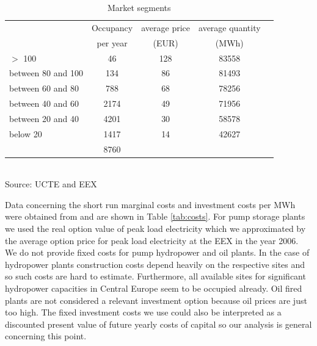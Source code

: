 \begin{table}[htb]
\centering
\caption{Market segments}
\vspace{0.3cm}
\begin{tabular}{lllll}
\hline
 & \multicolumn{1}{c}{Occupancy} & \multicolumn{1}{c}{average price} & \multicolumn{1}{c}{average quantity} &  \\ 
 & \multicolumn{1}{c}{per year} & \multicolumn{1}{c}{(EUR)} & \multicolumn{1}{c}{(MWh)} &  \\ 
 \hline
$>$ 100 & \multicolumn{1}{c}{46} & \multicolumn{1}{c}{128} & \multicolumn{1}{c}{83558} &  \\ 
between 80 and 100 & \multicolumn{1}{c}{134} & \multicolumn{1}{c}{86} & \multicolumn{1}{c}{81493} &  \\ 
between 60 and 80 & \multicolumn{1}{c}{788} & \multicolumn{1}{c}{68} & \multicolumn{1}{c}{78256} &  \\ 
between 40 and 60 & \multicolumn{1}{c}{2174} & \multicolumn{1}{c}{49} & \multicolumn{1}{c}{71956} &  \\ 
between 20 and 40 & \multicolumn{1}{c}{4201} & \multicolumn{1}{c}{30} & \multicolumn{1}{c}{58578} &  \\ 
below 20 & \multicolumn{1}{c}{1417} & \multicolumn{1}{c}{14} & \multicolumn{1}{c}{42627} &  \\
\hline
 & \multicolumn{1}{c}{8760} &  &  &  \\ 
 \hline
\end{tabular}
\label{tab:demand}
\\
\vspace{0.3cm}
\scriptsize Source: UCTE and EEX 
\end{table}


Data concerning the short run marginal costs and investment costs per MWh were obtained from \cite[p.46]{Auer2006} and are shown in Table \ref{tab:costs}. For pump storage plants we used the real option value of peak load electricity which we approximated by the average option price for peak load electricity at the EEX in the year 2006. We do not provide fixed costs for pump hydropower and oil plants. In the case of hydropower plants construction costs depend heavily on the respective sites and so such costs are hard to estimate. Furthermore, all available sites for significant hydropower capacities in Central Europe seem to be occupied already. Oil fired plants are not considered a relevant investment option because oil prices are just too high. The fixed investment costs we use could also be interpreted as a discounted present value of future yearly costs of capital so our analysis is general concerning this point.

